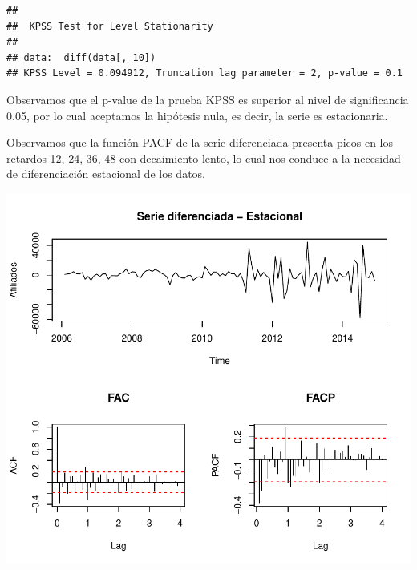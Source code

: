 \documentclass[11pt,a4paper,oneside]{article}\usepackage[]{graphicx}\usepackage[]{color}
\makeatletter
\def\maxwidth{ %
  \ifdim\Gin@nat@width>\linewidth
    \linewidth
  \else
    \Gin@nat@width
  \fi
}
\newenvironment{kframe}{%
 \def\at@end@of@kframe{}%
 \ifinner\ifhmode%
  \def\at@end@of@kframe{\end{minipage}}%
  \begin{minipage}{\columnwidth}%
 \fi\fi%
 \def\FrameCommand##1{\hskip\@totalleftmargin \hskip-\fboxsep
 \colorbox{shadecolor}{##1}\hskip-\fboxsep
     \hskip-\linewidth \hskip-\@totalleftmargin \hskip\columnwidth}%
 \MakeFramed {\advance\hsize-\width
   \@totalleftmargin\z@ \linewidth\hsize
   \@setminipage}}%
 {\par\unskip\endMakeFramed%
 \at@end@of@kframe}
\newenvironment{knitrout}{}{} %
\makeatother
\begin{document}
\begin{knitrout}
\color{fgcolor}\begin{kframe}
\begin{verbatim}
## 
## 	KPSS Test for Level Stationarity
## 
## data:  diff(data[, 10])
## KPSS Level = 0.094912, Truncation lag parameter = 2, p-value = 0.1
\end{verbatim}
\end{kframe}
\end{knitrout}

Observamos que el p-value de la prueba KPSS es superior al nivel de significancia 0.05, por lo cual aceptamos la hipótesis nula, es decir, la serie es estacionaria.\newline

Observamos que la función PACF de la serie diferenciada presenta picos en los retardos 12, 24, 36, 48 con decaimiento lento, lo cual nos conduce a la necesidad de diferenciación estacional de los datos.

\begin{knitrout}
\color{fgcolor}

{\centering \includegraphics[width=\maxwidth]{figure/unnamed-chunk-6-1} 

}



\end{knitrout}
\end{document}
